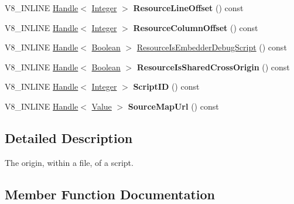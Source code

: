 \begin{DoxyCompactItemize}
\item 
\hypertarget{classv8_1_1_script_origin_a0735178b8afef9169a3481cf6cd7c557}{}V8\+\_\+\+I\+N\+L\+I\+N\+E \hyperlink{classv8_1_1_local}{Handle}$<$ \hyperlink{classv8_1_1_integer}{Integer} $>$ {\bfseries Resource\+Line\+Offset} () const \label{classv8_1_1_script_origin_a0735178b8afef9169a3481cf6cd7c557}

\item 
\hypertarget{classv8_1_1_script_origin_a6d1b4cb1be2b6589151a029974cd1a60}{}V8\+\_\+\+I\+N\+L\+I\+N\+E \hyperlink{classv8_1_1_local}{Handle}$<$ \hyperlink{classv8_1_1_integer}{Integer} $>$ {\bfseries Resource\+Column\+Offset} () const \label{classv8_1_1_script_origin_a6d1b4cb1be2b6589151a029974cd1a60}

\item 
V8\+\_\+\+I\+N\+L\+I\+N\+E \hyperlink{classv8_1_1_local}{Handle}$<$ \hyperlink{classv8_1_1_boolean}{Boolean} $>$ \hyperlink{classv8_1_1_script_origin_aa4e6fedf782dd605dc2cee4c8486a894}{Resource\+Is\+Embedder\+Debug\+Script} () const 
\item 
\hypertarget{classv8_1_1_script_origin_a632d2d30405d42512af609861e486bf2}{}V8\+\_\+\+I\+N\+L\+I\+N\+E \hyperlink{classv8_1_1_local}{Handle}$<$ \hyperlink{classv8_1_1_boolean}{Boolean} $>$ {\bfseries Resource\+Is\+Shared\+Cross\+Origin} () const \label{classv8_1_1_script_origin_a632d2d30405d42512af609861e486bf2}

\item 
\hypertarget{classv8_1_1_script_origin_abc222706ba9cdd48f8efaf4be227c078}{}V8\+\_\+\+I\+N\+L\+I\+N\+E \hyperlink{classv8_1_1_local}{Handle}$<$ \hyperlink{classv8_1_1_integer}{Integer} $>$ {\bfseries Script\+I\+D} () const \label{classv8_1_1_script_origin_abc222706ba9cdd48f8efaf4be227c078}

\item 
\hypertarget{classv8_1_1_script_origin_a5eb690f0c38f73aaad12120836bcb9a4}{}V8\+\_\+\+I\+N\+L\+I\+N\+E \hyperlink{classv8_1_1_local}{Handle}$<$ \hyperlink{classv8_1_1_value}{Value} $>$ {\bfseries Source\+Map\+Url} () const \label{classv8_1_1_script_origin_a5eb690f0c38f73aaad12120836bcb9a4}

\end{DoxyCompactItemize}


\subsection{Detailed Description}
The origin, within a file, of a script. 

\subsection{Member Function Documentation}
\hypertarget{classv8_1_1_script_origin_aa4e6fedf782dd605dc2cee4c8486a894}{}
